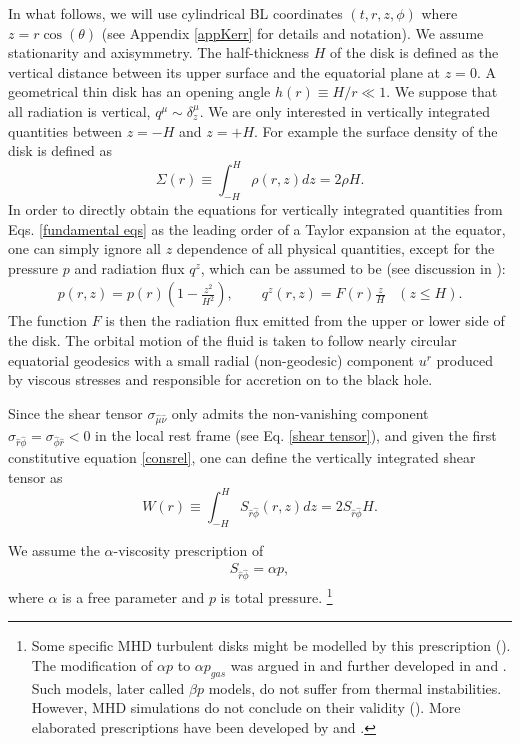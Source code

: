 \documentclass[a4paper,fleqn,usenatbib]{mnrasMOD}
\numberwithin{equation}{section}
\newcommand{\bea}{\begin{eqnarray}}
\newcommand{\eea}{\end{eqnarray}}
\newcommand{\be}{\begin{equation}}
\newcommand{\ee}{\end{equation}}
\begin{document}
In what follows, we will use cylindrical BL coordinates $(t,r,z,\phi)$ where $z=r \cos(\theta)$ (see Appendix \ref{appKerr} for details and notation). We assume stationarity and axisymmetry. The half-thickness $H$ of the disk is defined as the vertical distance between its upper surface and the equatorial plane at $z=0$. A geometrical thin disk has an opening angle $h(r) \equiv H/r \ll 1$. We suppose that all radiation is vertical, $q^\mu \sim \delta^\mu_z$. We are only interested in vertically integrated quantities between $z=-H$ and $z=+H$. For example the surface density of the disk is defined as
\be \label{surface density}
\Sigma(r) \equiv \int_{-H}^{H} \rho(r, z) dz = 2 \rho H.
\ee
In order to directly obtain the equations for vertically integrated quantities from Eqs. \eqref{fundamental eqs} as the leading order of a Taylor expansion at the equator, one can simply ignore all $z$ dependence of all physical quantities, except for the pressure $p$ and radiation flux $q^z$, which can be assumed to be (see discussion in \cite{1997ApJ...479..179A}):
\bea
p(r,z) =p(r) \left(1-\frac{z^2}{H^2}\right),\qquad q^z(r,z) = F(r) \frac{z}{H} \;\;\; (z \leq H). 
\eea
The function $F$ is then the radiation flux emitted from the upper or lower side of the disk. The orbital motion of the fluid is taken to follow nearly circular equatorial geodesics with a small radial (non-geodesic) component $u^r$ produced by viscous stresses and responsible for accretion on to the black hole. 

Since the shear tensor $\sigma_{\hat \mu \hat \nu}$ only admits the non-vanishing component $\sigma_{\hat r\hat \phi} = \sigma_{\hat \phi \hat r} < 0$ in the local rest frame (see Eq. \eqref{shear tensor}), and given the first constitutive equation \eqref{consrel}, one can define the vertically integrated shear tensor as 
\be \label{int shear tensor}
W(r) \equiv \int_{-H}^{H} S_{\hat{r}\hat{\phi}}(r, z) dz = 2 S_{\hat{r}\hat{\phi}} H. 
\ee

We assume the $\alpha$-viscosity prescription of \cite{1973A&A....24..337S} 
\bea
S_{\hat{r}\hat{\phi}} = \alpha p,
\eea
where $\alpha$ is a free parameter and $p$ is total pressure. \footnote{Some specific MHD turbulent disks might be modelled by this prescription (\cite{1999ApJ...521..650B}). The modification of $\alpha p$ to $\alpha p_{gas}$ was argued in \cite{1974ApJ...187L...1L} and further developed in \cite{1977A&A....59..111B} and \cite{1981ApJ...247...19S}. Such models, later called $\beta p$ models, do not suffer from thermal instabilities. However, MHD simulations do not conclude on their validity (\cite{Hirose:2008hi,2009PASJ...61L...7O,Ross:2015gga}). More elaborated prescriptions have been developed by \cite{2003MNRAS.340..969O} and \cite{PhysRevLett.97.221103}.} %
\end{document}

